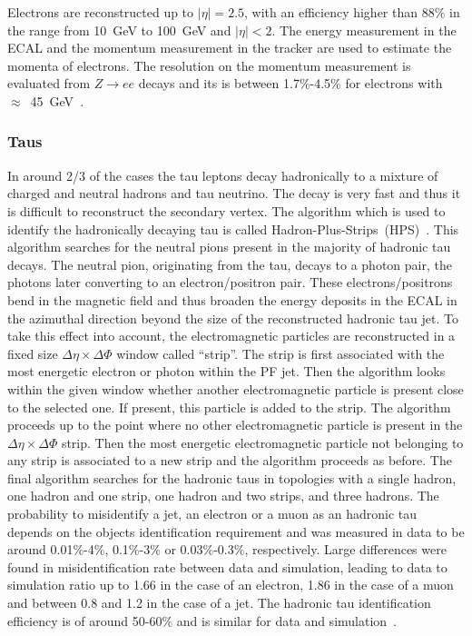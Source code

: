 Electrons are reconstructed up to $|\eta|=2.5$,  with an efficiency higher than 88\% in the \pt range from 10~GeV to 100~GeV and $|\eta|<2$. The energy measurement in the ECAL and the momentum measurement in the tracker are used to estimate the momenta of electrons. The resolution on the momentum measurement is evaluated from $Z \rightarrow ee$ decays and its is between 1.7\%-4.5\% for electrons with  \pt~$\approx$~45~GeV~\cite{Khachatryan:2015hwa}.



\subsubsection{Taus}

In around 2/3 of the cases the tau leptons decay hadronically to a mixture of charged and neutral hadrons and tau neutrino. The decay is very fast and thus it is difficult to reconstruct the secondary vertex. The algorithm which is used to identify the hadronically decaying tau is called Hadron-Plus-Strips~(HPS)~\cite{CMS:2016gvn}. This algorithm searches for the neutral pions present in the majority of hadronic tau decays. The neutral pion, originating from the tau, decays to a photon pair, the photons later converting to an electron/positron pair. These electrons/positrons bend in the magnetic field and thus broaden the energy deposits in the ECAL in the azimuthal direction beyond the size of the reconstructed hadronic tau jet. To take this effect into account, the electromagnetic particles  are reconstructed in a fixed size $\Delta \eta \times \Delta \Phi$ window called ``strip''. The strip is first associated with the most energetic electron or photon within the PF jet. Then the algorithm looks within the given window whether another electromagnetic particle is present close to the selected one. If present, this particle is added to the strip. The algorithm proceeds up to the point where no other electromagnetic particle is present in the $\Delta \eta \times \Delta \Phi$ strip. Then the most energetic electromagnetic particle not belonging to any strip is associated to a new strip and the algorithm proceeds as before. The final algorithm searches for the hadronic taus in topologies with a single hadron, one hadron and one strip, one hadron and two strips, and three hadrons. The probability to misidentify a jet, an electron or a muon as an hadronic tau  depends on the objects identification requirement and was measured in data to be around 0.01\%-4\%, 0.1\%-3\% or 0.03\%-0.3\%, respectively. Large differences were found in misidentification rate between data and simulation, leading to data to simulation ratio up to 1.66 in the case of an electron, 1.86 in the case of a muon and between 0.8 and 1.2 in the case of a jet. The hadronic tau identification efficiency is of around 50-60\% and is similar for data and simulation~\cite{Khachatryan:2015dfa}.

